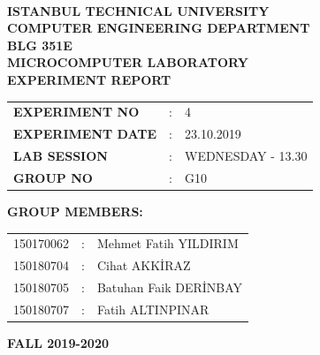 \documentclass[pdftex,12pt,a4paper]{article}
\begin{document}
\begin{titlepage}
\begin{center}
\textbf{}\\
\textbf{\Large{ISTANBUL TECHNICAL UNIVERSITY}}\\
\vspace{0.5cm}
\textbf{\Large{COMPUTER ENGINEERING DEPARTMENT}}\\
\vspace{2cm}
\textbf{\Large{BLG 351E\\ MICROCOMPUTER LABORATORY\\ EXPERIMENT REPORT}}\\
\vspace{2.8cm}
\begin{table}[ht]
\centering
\Large{
\begin{tabular}{lcl}
\textbf{EXPERIMENT NO}  & : & 4 \\
\textbf{EXPERIMENT DATE}  & : & 23.10.2019 \\
\textbf{LAB SESSION}  & : & WEDNESDAY - 13.30 \\
\textbf{GROUP NO}  & : & G10 \\
\end{tabular}}
\end{table}
\vspace{1cm}
\textbf{\Large{GROUP MEMBERS:}}\\
\begin{table}[ht]
\centering
\Large{
\begin{tabular}{rcl}
150170062  & : & Mehmet Fatih YILDIRIM \\
150180704  & : & Cihat AKK\.{I}RAZ \\
150180705  & : & Batuhan Faik DER\.{I}NBAY \\
150180707  & : & Fatih ALTINPINAR \\
\end{tabular}}
\end{table}
\vspace{2.8cm}
\textbf{\Large{FALL 2019-2020}}

\end{center}

\end{titlepage}

\newpage


\thispagestyle{empty}
\setcounter{tocdepth}{4}
\tableofcontents
\clearpage

\setcounter{page}{1}
\end{document}
